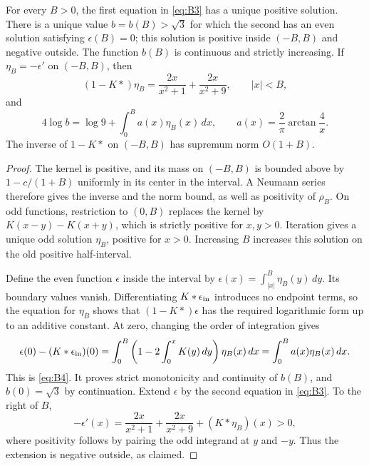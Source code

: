 \begin{lemma}
\label{lem:brownian-equations}
For every $B>0$, the first equation in \eqref{eq:B3} has a unique positive
solution.  There is a unique value $b=b(B)>\sqrt3$ for which the second
has an even solution satisfying $\epsilon(B)=0$; this solution is positive
inside $(-B,B)$ and negative outside.  The function $b(B)$ is continuous
and strictly increasing.  If $\eta_B=-\epsilon'$ on $(-B,B)$, then
\[
 (1-K*)\eta_B=
      \frac{2x}{x^2+1}+\frac{2x}{x^2+9},\qquad |x|<B,
\]
and
\begin{equation}
 4\log b=\log9+\int_0^B a(x)\eta_B(x)\,dx,
 \qquad a(x)=\frac2\pi\arctan\frac4x.
 \label{eq:B4}
\end{equation}
The inverse of $1-K*$ on $(-B,B)$ has supremum norm $O(1+B)$.
\end{lemma}

\begin{proof}
The kernel is positive, and its mass on $(-B,B)$ is bounded above by
$1-c/(1+B)$ uniformly in its center in the interval.  A Neumann series
therefore gives the inverse and the norm bound, as well as positivity of
$\rho_B$.  On odd functions, restriction to $(0,B)$ replaces the kernel
by $K(x-y)-K(x+y)$, which is strictly positive for $x,y>0$.
Iteration gives a unique odd solution $\eta_B$, positive for $x>0$.
Increasing $B$ increases this solution on the old positive half-interval.

Define the even function $\epsilon$ inside the interval by
$\epsilon(x)=\int_{|x|}^B\eta_B(y)\,dy$.
Its boundary values vanish.  Differentiating $K*\epsilon_{\rm in}$
introduces no endpoint terms, so the equation for $\eta_B$ shows that
$(1-K*)\epsilon$ has the required logarithmic form up to an additive
constant.  At zero, changing the order of integration gives
\[
 \epsilon(0)-(K*\epsilon_{\rm in})(0)
 =\int_0^B\left(1-2\int_0^xK(y)\,dy\right)\eta_B(x)\,dx
 =\int_0^B a(x)\eta_B(x)\,dx.
\]
This is \eqref{eq:B4}.  It proves strict monotonicity and continuity of
$b(B)$, and $b(0)=\sqrt3$ by continuation.  Extend $\epsilon$ by the
second equation in \eqref{eq:B3}.  To the right of $B$,
\[
 -\epsilon'(x)=\frac{2x}{x^2+1}+\frac{2x}{x^2+9}
                      +(K*\eta_B)(x)>0,
\]
where positivity follows by pairing the odd integrand at $y$ and $-y$.
Thus the extension is negative outside, as claimed.
\end{proof}

